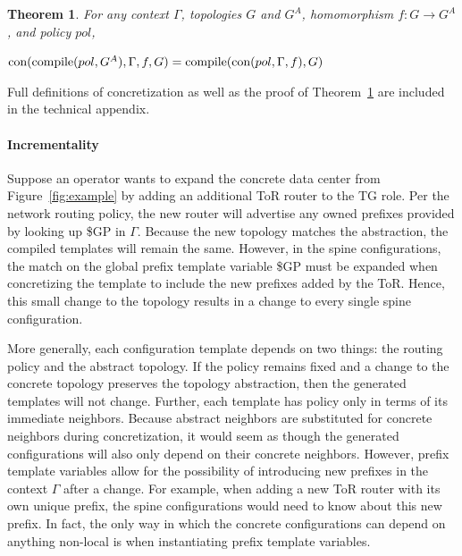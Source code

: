 \documentclass[numbers, 10pt, preprint]{sigplanconf}
\newcommand{\para}[1]{\paragraph*{\textbf{#1}}}
\newtheorem{thm}{Theorem}[section]
\newcommand{\Appendix}{technical appendix\xspace}
\begin{document}
\begin{thm}
  For any context $\Gamma$, topologies $G$ and $G^A$, homomorphism $f : G \rightarrow G^A$, and policy $pol$,

  \vspace{1em}
  \noindent
  $\text{con}(\text{compile}(pol,G^A), \Gamma,f,G) = \text{compile}(\text{con}(pol,\Gamma,f),G)$
  \label{thm:concretization}
\end{thm}
%
\vspace{-.6em}
Full definitions of concretization as well as the proof of Theorem~\ref{thm:concretization} are included in the \Appendix. 

\para{Incrementality}

Suppose an operator wants to expand the concrete data center from Figure~\ref{fig:example} by adding an additional ToR router to the TG role. Per the network routing policy, the new router will advertise any owned prefixes provided by looking up {\small \$GP} in $\Gamma$. Because the new topology matches the abstraction, the compiled templates will remain the same. However, in the spine configurations, the match on the global prefix template variable {\small \$GP} must be expanded when concretizing the template to include the new prefixes added by the ToR. Hence, this small change to the topology results in a change to every single spine configuration.

More generally, each configuration template depends on two things: the routing policy and the abstract topology. If the policy remains fixed and a change to the concrete topology preserves the topology abstraction, then the generated templates will not change. Further, each template has policy only in terms of its immediate neighbors. Because abstract neighbors are substituted for concrete neighbors during concretization, it would seem as though the generated configurations will also only depend on their concrete neighbors. However, prefix template variables allow for the possibility of introducing new prefixes in the context $\Gamma$ after a change. For example, when adding a new ToR router with its own unique prefix, the spine configurations would need to know about this new prefix.
%
In fact, the only way in which the concrete configurations can depend on anything non-local is when instantiating prefix template variables. 
\end{document}
